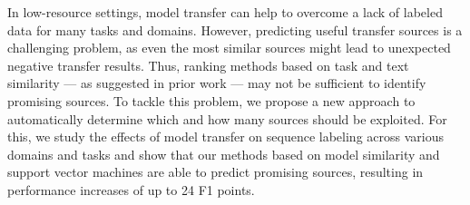 In low-resource settings, model transfer can help to overcome a lack of labeled data for many tasks and domains. However, predicting useful transfer sources is a challenging problem, as even the most similar sources might lead to unexpected negative transfer results. Thus, ranking methods based on task and text similarity — as suggested in prior work — may not be sufficient to identify promising sources. To tackle this problem, we propose a new approach to automatically determine which and how many sources should be exploited. For this, we study the effects of model transfer on sequence labeling across various domains and tasks and show that our methods based on model similarity and support vector machines are able to predict promising sources, resulting in performance increases of up to 24 F1 points.
